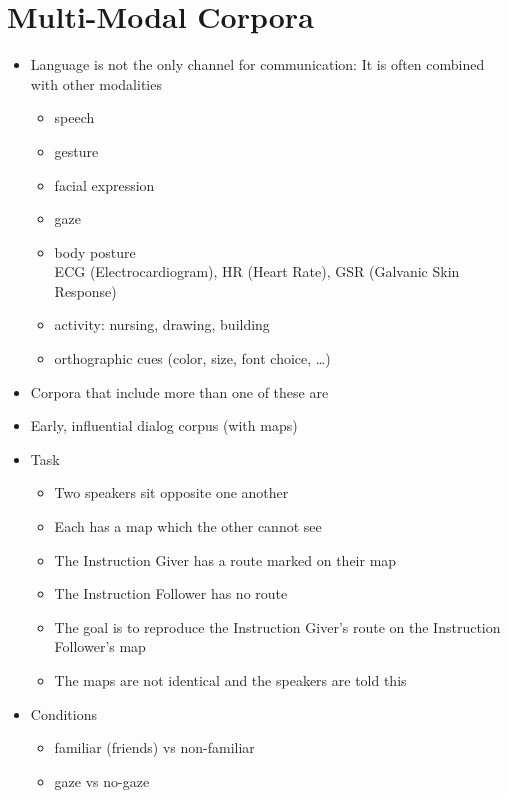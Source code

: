 \documentclass[a4paper,landscape,headrule,footrule,xetex]{foils}
\begin{document}

\section{Multi-Modal Corpora}


\begin{itemize}
\item Language is not the only channel for communication: It is often
  combined with other modalities
  \begin{itemize}
  \item speech
  \item gesture
  \item facial expression
  \item gaze
  \item body posture
\\ ECG (Electrocardiogram), HR (Heart Rate), GSR (Galvanic Skin Response)
  \item activity: nursing, drawing, building
  \item orthographic cues (color, size, font choice, \ldots)
  \end{itemize}
\item Corpora that include more than one of these are 
\end{itemize}

\begin{itemize}
\item Early, influential dialog corpus (with maps)
\item Task
  \begin{itemize}
  \item Two speakers sit opposite one another
  \item Each has a map which the other cannot see
  \item The Instruction Giver has a route marked on their map
  \item The Instruction Follower has no route
  \item The goal is to reproduce the Instruction Giver's route on the Instruction Follower's map
  \item The maps are not identical and the speakers are told this
  \end{itemize}
\item Conditions
  \begin{itemize}
  \item familiar (friends) vs non-familiar
  \item gaze vs no-gaze
  \end{itemize}
\end{itemize}
\end{document}
